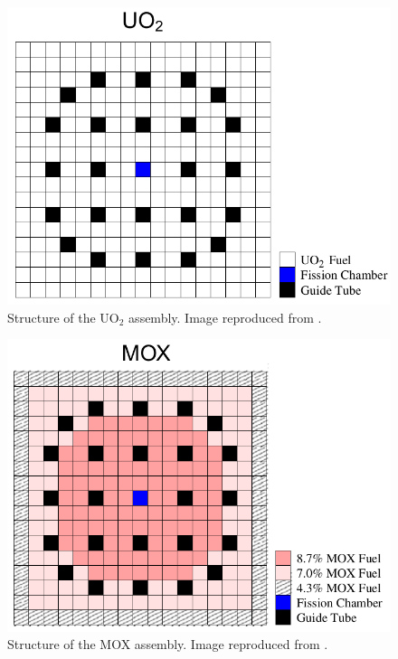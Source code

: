 \documentclass{anstrans}
\begin{document}
\begin{figure}[htbp!] %
    \centering
    \includegraphics[trim=0 0 0 2.1cm, clip=true, width=0.95\linewidth]{figures/bench-config2.png}
    \hfill
    \caption{Structure of the UO$_2$ assembly. Image reproduced from \cite{capilla_applications_2009}.}
    \label{fig:bench2}
\end{figure}

\begin{figure}[h] %
    \centering
    \includegraphics[trim=0 0 0 2.1cm, clip=true, width=0.95\linewidth]{figures/bench-config3.png}
    \hfill
    \caption{Structure of the MOX assembly. Image reproduced from \cite{capilla_applications_2009}.}
    \label{fig:bench3}
\end{figure}
\end{document}
